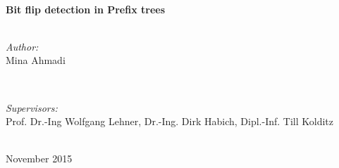 \documentclass[12pt]{report}
\begin{document}
\begin{titlepage}

\HRule \\[0.4cm]
{ \huge \bfseries Bit flip detection in Prefix trees}\\[0.4cm] %
\HRule \\[1.5cm]
 

\begin{minipage}{0.4\textwidth}
\begin{flushleft} \large
\emph{Author:}\\
Mina Ahmadi %
\end{flushleft}
\end{minipage}
~
\begin{minipage}{0.47\textwidth}
\begin{flushright} \large
\emph{Supervisors:} \\
Prof. Dr.-Ing Wolfgang Lehner, Dr.-Ing. Dirk Habich, Dipl.-Inf. Till Kolditz  %
\end{flushright}
\end{minipage}\\[4cm]





{\large{November 2015}}\\[3cm] %
 

\vfill %

\end{titlepage}
\end{document}
